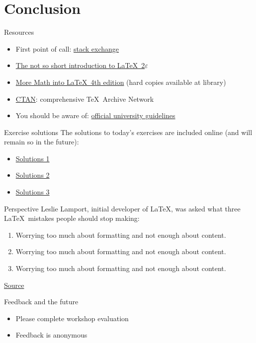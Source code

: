 \section*{Conclusion}

\addtocounter{section}{1}

\begin{frame}{Resources}
  \begin{itemize}
    \item First point of call:
      \href{https://tex.stackexchange.com/}{stack exchange}
    \item \href{https://tobi.oetiker.ch/lshort/lshort.pdf}%
      {The not so short introduction to \LaTeX\ 2$\varepsilon$}
    \item \href{https://link.springer.com/content/pdf/10.1007\%2F978-0-387-68852-7.pdf}%
      {More Math into \LaTeX\ 4th edition} (hard copies available at library)
    \item \href{https://www.ctan.org/}{CTAN}: comprehensive \TeX\ Archive
      Network
    \item You should be aware of:
      \href{https://www.ncl.ac.uk/students/progress/assets/documents/GuidelinesfortheSubmissionandFormatofThesis-January2018.pdf}%
      {official university guidelines}
  \end{itemize}
\end{frame}

\begin{frame}{Exercise solutions}
  The solutions to today's exercises are included online (and will remain so
  in the future):
  \begin{itemize}
    \item \href{https://jwalton.info/assets/teaching/latex/solutions_1.zip}%
	    {Solutions 1}
    \item \href{https://jwalton.info/assets/teaching/latex/solutions_2.tex}%
	    {Solutions 2}
    \item \href{https://jwalton.info/assets/teaching/latex/solutions_3.zip}%
	    {Solutions 3}
  \end{itemize}
\end{frame}

\begin{frame}{Perspective}
  Leslie Lamport, initial developer of \LaTeX, was asked what three \LaTeX\
  mistakes people should stop making:
  \begin{enumerate}
    \item Worrying too much about formatting and not enough about content.
    \item Worrying too much about formatting and not enough about content.
    \item Worrying too much about formatting and not enough about content.
  \end{enumerate}
  \href{https://www.microsoft.com/en-us/research/uploads/prod/2016/12/TeX-changed-the-face-of-Mathematics.pdf}%
  {Source}
\end{frame}

\begin{frame}{Feedback and the future}
  \begin{itemize}
    \item Please complete workshop evaluation
    \item Feedback is anonymous
  \end{itemize}
\end{frame}

